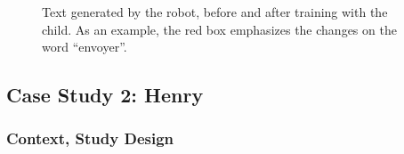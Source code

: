\documentclass{article}
\begin{document}
\begin{figure}
    \centering

    \caption{\small Text generated by the robot, before and after training with
    the child. As an example, the red box emphasizes the changes on the word
    ``envoyer''.}
    \label{fig:stimuli}
\end{figure}


\subsection{Case Study 2: Henry}

\subsubsection{Context, Study Design}
\end{document}
